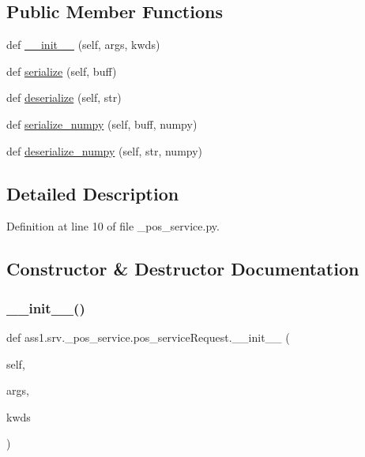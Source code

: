 \subsection*{Public Member Functions}
\begin{DoxyCompactItemize}
\item 
def \hyperlink{classass1_1_1srv_1_1__pos__service_1_1pos__serviceRequest_a1f9494c3234f8e8453564b09439223b8}{\+\_\+\+\_\+init\+\_\+\+\_\+} (self, args, kwds)
\item 
def \hyperlink{classass1_1_1srv_1_1__pos__service_1_1pos__serviceRequest_a91fc549468cf02d34424f09ee343a696}{serialize} (self, buff)
\item 
def \hyperlink{classass1_1_1srv_1_1__pos__service_1_1pos__serviceRequest_ad91716be46b462564eb0476ef67e3442}{deserialize} (self, str)
\item 
def \hyperlink{classass1_1_1srv_1_1__pos__service_1_1pos__serviceRequest_ae27ff77bf2618f87a15491f95107f016}{serialize\+\_\+numpy} (self, buff, numpy)
\item 
def \hyperlink{classass1_1_1srv_1_1__pos__service_1_1pos__serviceRequest_a7f7884f95f196e8a3fc22a34aaeb00cc}{deserialize\+\_\+numpy} (self, str, numpy)
\end{DoxyCompactItemize}


\subsection{Detailed Description}


Definition at line 10 of file \+\_\+pos\+\_\+service.\+py.



\subsection{Constructor \& Destructor Documentation}
\mbox{\label{classass1_1_1srv_1_1__pos__service_1_1pos__serviceRequest_a1f9494c3234f8e8453564b09439223b8}} 
\subsubsection{\texorpdfstring{\+\_\+\+\_\+init\+\_\+\+\_\+()}{\_\_init\_\_()}}
{\footnotesize\ttfamily def ass1.\+srv.\+\_\+pos\+\_\+service.\+pos\+\_\+service\+Request.\+\_\+\+\_\+init\+\_\+\+\_\+ (\begin{DoxyParamCaption}\item[{}]{self,  }\item[{}]{args,  }\item[{}]{kwds }\end{DoxyParamCaption})}

